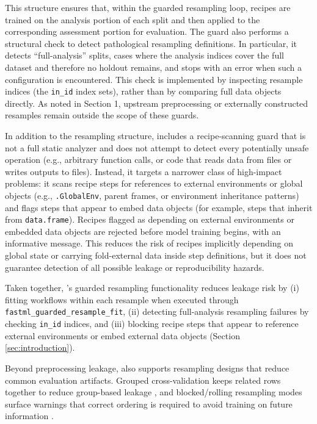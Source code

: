 This structure ensures that, within the guarded resampling loop, recipes are trained on the analysis portion of each split and then applied to the corresponding assessment portion for evaluation. The guard also performs a structural check to detect pathological resampling definitions. In particular, it detects ``full-analysis'' splits, cases where the analysis indices cover the full dataset and therefore no holdout remains, and stops with an error when such a configuration is encountered. This check is implemented by inspecting resample indices (the \texttt{in\_id} index sets), rather than by comparing full data objects directly. As noted in Section 1, upstream preprocessing or externally constructed resamples remain outside the scope of these guards.

In addition to the resampling structure,  includes a recipe-scanning guard that is not a full static analyzer and does not attempt to detect every potentially unsafe operation (e.g., arbitrary function calls, or code that reads data from files or writes outputs to files). Instead, it targets a narrower class of high-impact problems: it scans recipe steps for references to external environments or global objects (e.g., \texttt{.GlobalEnv}, parent frames, or environment inheritance patterns) and flags steps that appear to embed data objects (for example, steps that inherit from \texttt{data.frame}). Recipes flagged as depending on external environments or embedded data objects are rejected before model training begins, with an informative message. This reduces the risk of recipes implicitly depending on global state or carrying fold-external data inside step definitions, but it does not guarantee detection of all possible leakage or reproducibility hazards.

Taken together, 's guarded resampling functionality reduces leakage risk by (i) fitting workflows within each resample when executed through \texttt{fastml\_guarded\_resample\_fit}, (ii) detecting full-analysis resampling failures by checking \texttt{in\_id} indices, and (iii) blocking recipe steps that appear to reference external environments or embed external data objects (Section \ref{sec:introduction}).

Beyond preprocessing leakage,  also supports resampling designs that reduce common evaluation artifacts. Grouped cross-validation keeps related rows together to reduce group-based leakage \citep{Kuhn:2013_APM}, and blocked/rolling resampling modes surface warnings that correct ordering is required to avoid training on future information \citep{Hyndman:2018_forecasting}.

